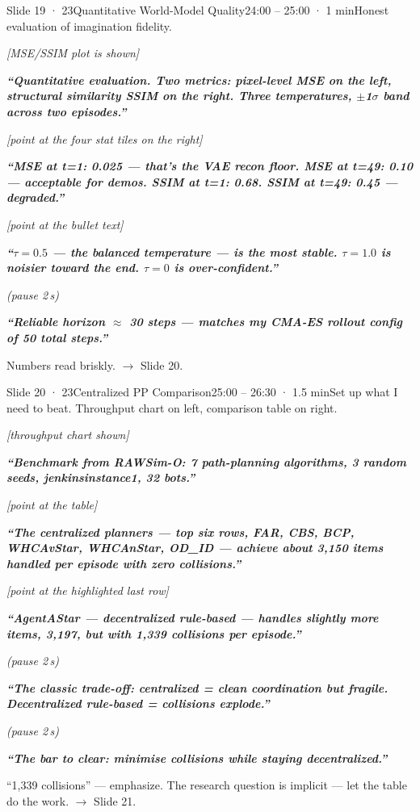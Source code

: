 \documentclass[11pt,a4paper]{article}
\newcommand{\say}[1]{%
    \par\vspace{0.3em}%
    \begingroup
    \leftskip=12pt
    \rightskip=8pt
    \color{thStrong}%
    \itshape\textbf{“#1”}%
    \par
    \endgroup
    \vspace{0.2em}
}
\newcommand{\beat}[1][2]{%
    \par\textcolor{thMuted}{\small\textit{(pause #1\,s)}}\par
    \vspace{0.2em}
}
\newcommand{\stage}[1]{%
    \par\textcolor{thMuted}{\small\textit{[#1]}}\par
    \vspace{0.2em}
}
\newcommand{\emphw}[1]{\textbf{\textcolor{thAmber}{#1}}}
\newcommand{\emphteal}[1]{\textbf{\textcolor{thTeal}{#1}}}
\newcommand{\emphcoral}[1]{\textbf{\textcolor{thCoral}{#1}}}
\begin{document}
\begin{slide}{Slide 19 · 23}{Quantitative World-Model Quality}{24:00 – 25:00 · 1 min}{Honest evaluation of imagination fidelity.}
\stage{MSE/SSIM plot is shown}

\say{Quantitative evaluation. Two metrics: pixel-level MSE on the left, structural similarity SSIM on the right. Three temperatures, $\pm$1$\sigma$ band across two episodes.}

\stage{point at the four stat tiles on the right}

\say{\emphteal{MSE at t=1: 0.025} — that's the VAE recon floor. \emphcoral{MSE at t=49: 0.10} — acceptable for demos. \emphteal{SSIM at t=1: 0.68}. \emphcoral{SSIM at t=49: 0.45} — degraded.}

\stage{point at the bullet text}

\say{$\tau = 0.5$ — the balanced temperature — is the most stable. $\tau = 1.0$ is noisier toward the end. $\tau = 0$ is over-confident.}
\beat
\say{\emphw{Reliable horizon $\approx$ 30 steps} — matches my CMA-ES rollout config of 50 total steps.}

\begin{stagebox}
Numbers read briskly. $\rightarrow$ Slide 20.
\end{stagebox}
\end{slide}

\begin{slide}{Slide 20 · 23}{Centralized PP Comparison}{25:00 – 26:30 · 1.5 min}{Set up what I need to beat. Throughput chart on left, comparison table on right.}
\stage{throughput chart shown}

\say{Benchmark from RAWSim-O: 7 path-planning algorithms, 3 random seeds, jenkinsinstance1, 32 bots.}

\stage{point at the table}

\say{The centralized planners — top six rows, FAR, CBS, BCP, WHCAvStar, WHCAnStar, OD\_ID — achieve about \textbf{3{,}150 items handled per episode} with \emphteal{zero collisions}.}

\stage{point at the highlighted last row}

\say{\emphw{AgentAStar} — decentralized rule-based — handles slightly more items, \textbf{3{,}197}, but with \emphcoral{1{,}339 collisions per episode}.}
\beat
\say{The classic trade-off: centralized = clean coordination but fragile. Decentralized rule-based = collisions explode.}
\beat
\say{\textbf{The bar to clear: minimise collisions while staying decentralized.}}

\begin{stagebox}
``1,339 collisions'' — emphasize. The research question is implicit — let the table do the work. $\rightarrow$ Slide 21.
\end{stagebox}
\end{slide}
\end{document}
